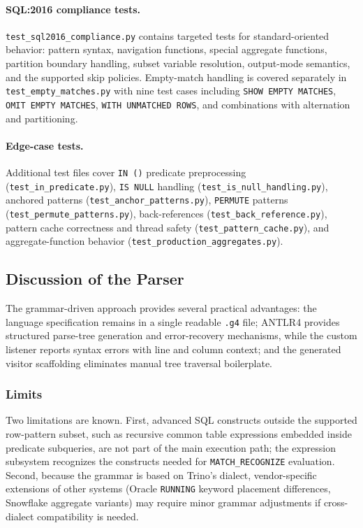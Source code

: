 \paragraph{SQL:2016 compliance tests.}
\texttt{test\_sql2016\_compliance.py} contains targeted tests for
standard-oriented behavior: pattern syntax, navigation functions,
special aggregate functions, partition boundary handling, subset
variable resolution, output-mode semantics, and the supported skip
policies.  Empty-match handling is
covered separately in \texttt{test\_empty\_matches.py} with nine
test cases including \texttt{SHOW EMPTY MATCHES},
\texttt{OMIT EMPTY MATCHES}, \texttt{WITH UNMATCHED ROWS}, and
combinations with alternation and partitioning.

\paragraph{Edge-case tests.}
Additional test files cover \texttt{IN~()} predicate preprocessing
(\texttt{test\_in\_predicate.py}),
\texttt{IS~NULL} handling (\texttt{test\_is\_null\_handling.py}),
anchored patterns (\texttt{test\_anchor\_patterns.py}),
\texttt{PERMUTE} patterns (\texttt{test\_permute\_patterns.py}),
back-references (\texttt{test\_back\_reference.py}),
pattern cache correctness and thread safety
(\texttt{test\_pattern\_cache.py}), and aggregate-function behavior
(\texttt{test\_production\_aggregates.py}).

\subsection{Discussion of the Parser}
\label{subsec:meth-parser-discussion}

The grammar-driven approach provides several practical advantages:
the language specification remains in a single readable
\texttt{.g4} file; ANTLR4 provides structured parse-tree generation
and error-recovery mechanisms, while the custom listener reports
syntax errors with line and column context; and the generated
visitor scaffolding eliminates manual tree traversal boilerplate.

\subsubsection{Limits}
\label{subsubsec:meth-parser-limits}

Two limitations are known.  First, advanced SQL constructs outside
the supported row-pattern subset, such as recursive common table
expressions embedded inside predicate subqueries, are not part of the
main execution path; the expression subsystem recognizes the
constructs needed for \texttt{MATCH\_RECOGNIZE} evaluation.  Second,
because the grammar is based on Trino's dialect, vendor-specific
extensions of other systems (Oracle \texttt{RUNNING} keyword
placement differences, Snowflake aggregate variants) may require
minor grammar adjustments if cross-dialect compatibility is needed.

